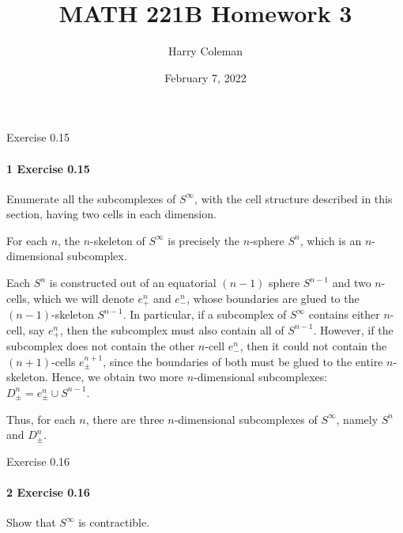 \documentclass[12pt]{article}
\renewcommand{\maketitle}{\thispagestyle{title}}
\newlength{\myparskip}
\newenvironment{fullbox}{\begin{lrbox}{\savefullbox}\begin{minipage}{\dimexpr\textwidth-2\fboxsep\relax}\setlength{\parskip}{\myparskip}}{\end{minipage}\end{lrbox}\framebox[\textwidth]{\usebox{\savefullbox}}}
\newenvironment{pbox}[1][]{\begin{fullbox}\ifx#1\empty\else\paragraph{#1}\phantom{}\fi}{\end{fullbox}}
\theoremstyle{definition}
\newcommand{\<}{\langle}
\renewcommand{\>}{\rangle}
\begin{document}
\title{MATH 221B Homework 3}
\author{Harry Coleman\makebox[0pt][r]{\raisebox{-0.25in}[0pt][0pt]{(worked with Joseph Sullivan, Gahl Shemy)}}}
\date{February 7, 2022}
\maketitle


\begin{pbox}[1 Exercise 0.15]
    Enumerate all the subcomplexes of $S^\infty$, with the cell structure described in this section, having two cells in each dimension.
\end{pbox}

For each $n$, the $n$-skeleton of $S^\infty$ is precisely the $n$-sphere $S^n$, which is an $n$-dimensional subcomplex.

Each $S^n$ is constructed out of an equatorial $(n-1)$ sphere $S^{n-1}$ and two $n$-cells, which we will denote $e^n_+$ and $e^n_-$, whose boundaries are glued to the $(n-1)$-skeleton $S^{n-1}$.
In particular, if a subcomplex of $S^\infty$ contains either $n$-cell, say $e^n_+$, then the subcomplex must also contain all of $S^{n-1}$.
However, if the subcomplex does not contain the other $n$-cell $e^n_-$, then it could not contain the $(n+1)$-cells $e^{n+1}_\pm$, since the boundaries of both must be glued to the entire $n$-skeleton.
Hence, we obtain two more $n$-dimensional subcomplexes: $D^n_\pm = e^n_\pm \cup S^{n-1}$.

Thus, for each $n$, there are three $n$-dimensional subcomplexes of $S^\infty$, namely $S^n$ and $D^n_\pm$.

 
\begin{pbox}[2 Exercise 0.16]
    Show that $S^\infty$ is contractible.
\end{pbox}
\end{document}
